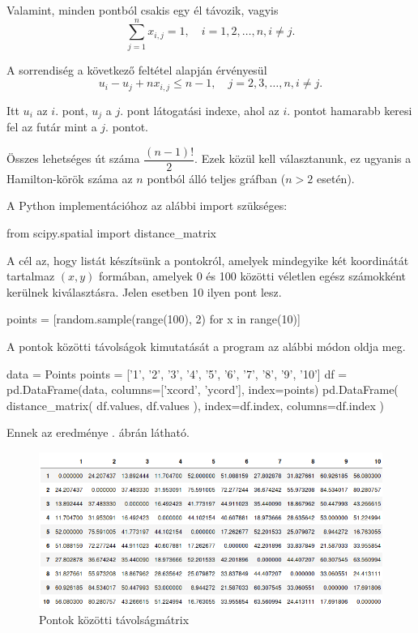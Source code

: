 Valamint, minden pontból csakis egy él távozik, vagyis
\[
\displaystyle
\sum_{j=1}^n x_{i,j} = 1, \quad i = 1, 2, \ldots, n, i \neq j.
\]

A sorrendiség a következő feltétel alapján érvényesül
\[
u_i - u_j + n x_{i,j} \leq n - 1, \quad j = 2, 3, \ldots, n, i \neq j.
\]

Itt $u_{i}$ az $i.$ pont, $u_{j}$ a $j.$ pont látogatási indexe, ahol az $i.$ pontot hamarabb keresi fel az futár mint a $j.$ pontot.


Összes lehetséges út száma
\(
\dfrac{(n-1)!}{2}.
\)
Ezek közül kell választanunk, ez ugyanis a Ha\-mil\-ton-körök száma az $n$ pontból álló teljes gráfban ($n > 2$ esetén).

A Python implementációhoz az alábbi import szükséges:
\begin{python}
from scipy.spatial import distance_matrix
\end{python}
A cél az, hogy listát készítsünk a pontokról, amelyek mindegyike két koordinátát tartalmaz $(x, y)$ formában, amelyek 0 és 100 közötti véletlen egész számokként kerülnek kiválasztásra. Jelen esetben 10 ilyen pont lesz.
\begin{python}
points = [random.sample(range(100), 2) for x in range(10)]
\end{python}
A pontok közötti távolságok kimutatását a program az alábbi módon oldja meg.
\begin{python}
data = Points
points = ['1', '2', '3', '4', '5', '6', '7', '8', '9', '10']
df = pd.DataFrame(data, columns=['xcord', 'ycord'], index=points)
pd.DataFrame(
	distance_matrix(
		df.values, 
		df.values
	), 
	index=df.index,
	columns=df.index
)
\end{python}

Ennek az eredménye . ábrán látható.

\begin{figure}[h!]
\centering
\includegraphics[width=\textwidth]{images/table.png}
\caption{Pontok közötti távolságmátrix}
\label{fig:kimenet}
\end{figure}

